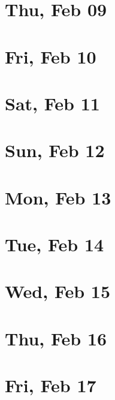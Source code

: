 	\section{Thu, Feb 09}
		
		
	\section{Fri, Feb 10}
		
		
	\section{Sat, Feb 11}
		
		
	\section{Sun, Feb 12}
		
		
	\section{Mon, Feb 13}
		
		
	\section{Tue, Feb 14}
		
		
	\section{Wed, Feb 15}
		
		
	\section{Thu, Feb 16}
		
		
	\section{Fri, Feb 17}
		
		

